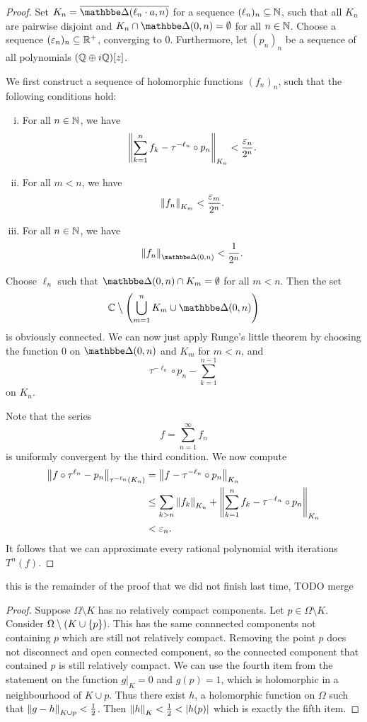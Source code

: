 \begin{proof}
Set $K_n = \oline{\dsk(\ell_n \cdot a, n)}$ for a sequence
$(\ell_n)_n \subseteq \mathbb{N}$, such that all $K_n$ are pairwise
disjoint and $K_n \cap \dsk(0, n) = \emptyset$ for all $n \in \mathbb{N}$.
Choose a sequence $(\varepsilon_n)_n \subseteq \mathbb{R}^+$, converging to
$0$. Furthermore, let $(p_n)_n$ be a sequence of all polynomials
$(\mathbb{Q} \oplus i\mathbb{Q})[z]$.

We first construct a sequence of holomorphic functions $(f_n)_n$,
such that the following conditions hold:

\begin{enumerate}[i)]
\item For all $n \in \mathbb{N}$, we have
\[
\left\lVert \sum_{k=1}^n f_k - \tau^{-\ell_n} \circ p_n\right\rVert_{K_n} <
\frac{\varepsilon_n}{2^n}.
\]
\item For all $m < n$, we have
\[
\left\lVert f_n\right\rVert_{K_m} < \frac{\varepsilon_m}{2^n}.
\]
\item For all $n \in \mathbb{N}$, we have
\[
\norm{f_n}_{\dsk(0,n)} < \frac{1}{2^n}.
\]
\end{enumerate}

Choose $\ell_n$ such that $\dsk(0,n) \cap K_m = \emptyset$ for all
$m < n$. Then the set
\[
\C \bigsetminus \br{\bigcup_{m=1}^n K_m \cup \dsk(0,n)}
\]
is obviously connected. We can now just apply Runge's little
theorem by choosing the function $0$ on $\dsk(0,n)$ and $K_m$ for
$m < n$, and
\[
\tau^{-\ell_n} \circ p_n - \sum_{k=1}^{n-1}
\]
on $K_n$.

Note that the series
\[
f = \sum_{n=1}^\infty f_n
\]
is uniformly convergent by the third condition. We now compute
\begin{align*}
\left\lVert f \circ \tau^{\ell_n} - p_n\right\rVert_{\tau^{-\ell_n}(K_n)} &=
\left\lVert f - \tau^{-\ell_n} \circ p_n\right\rVert_{K_n}
\\
&\leq
\sum_{k > n} \left\lVert f_k\right\rVert_{K_n} +
\left\lVert \sum_{k=1}^n f_k - \tau^{-\ell_n} \circ p_n\right\rVert_{K_n}
\\
&<
\varepsilon_n.
\end{align*}
It follows that we can approximate every rational polynomial with
iterations $T^n(f)$.
\end{proof}



this is the remainder of the proof that we did not finish last time, TODO merge
\begin{proof}
    Suppose $\Omega \setminus K$ has no relatively compact components. Let $p \in \Omega \setminus K$. Consider $\Omega \setminus (K \cup \left\{p\right\})$. This has the same connnected components not containing $p$ which are still not relatively compact. Removing the point $p$ does not disconnect and open connected component, so the connected component that contained $p$ is still relatively compact. We can use the fourth item from the statement on the function $g|_K = 0$ and $g(p) = 1$, which is holomorphic in a neighbourhood of $K \cup p$. Thus there exist $h$, a holomorphic function on $\Omega$ such that $\left\lVert g - h\right\rVert_{K \cup p} < \frac{1}{2}$. Then $\left\lVert h\right\rVert_K < \frac{1}{2} < \left\lvert h(p)\right\rvert$ which is exactly the fifth item.
\end{proof}

